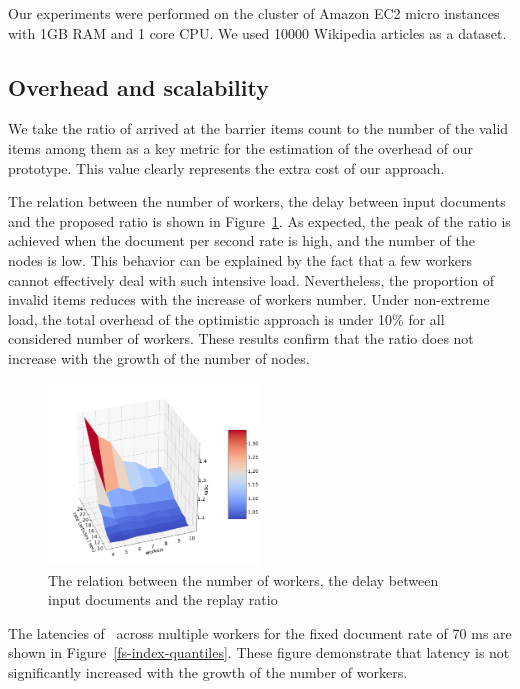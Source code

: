 Our experiments were performed on the cluster of Amazon EC2 micro instances with 1GB RAM and 1 core CPU. We used 10000 Wikipedia articles as a dataset. 

\subsection{Overhead and scalability}

We take the ratio of arrived at the barrier items count to the number of the valid items among them as a key metric for the estimation of the overhead of our prototype. This value clearly represents the extra cost of our approach.

The relation between the number of workers, the delay between input documents and the proposed ratio is shown in Figure~\ref{overhead}. As expected, the peak of the ratio is achieved when the document per second rate is high, and the number of the nodes is low. This behavior can be explained by the fact that a few workers cannot effectively deal with such intensive load. Nevertheless, the proportion of invalid items reduces with the increase of workers number. Under non-extreme load, the total overhead of the optimistic approach is under 10\% for all considered number of workers. These results confirm that the ratio does not increase with the growth of the number of nodes.

\begin{figure}[htbp]
  \centering
  \includegraphics[width=0.5\textwidth]{pics/overhead}
  \caption{The relation between the number of workers, the delay between input documents and the replay ratio}
  \label {overhead}
\end{figure}

The latencies of \FlameStream\ across multiple workers for the fixed document rate of 70 ms are shown in Figure~\ref{fs-index-quantiles}. These figure demonstrate that latency is not significantly increased with the growth of the number of workers. 

